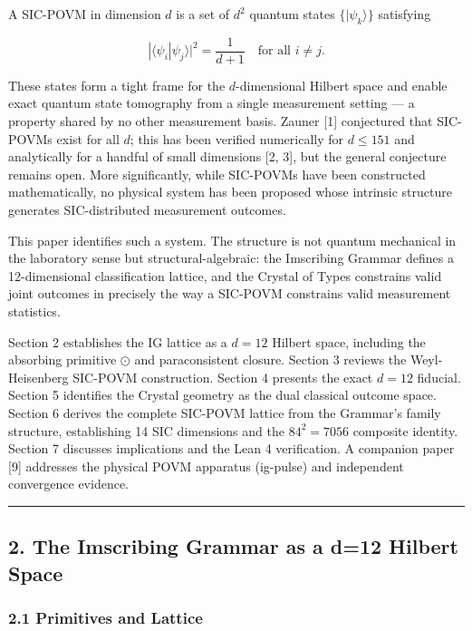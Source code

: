 \documentclass[12pt,a4paper]{article}
\begin{document}
A SIC-POVM in dimension \(d\) is a set of \(d^2\) quantum states
\(\{|\psi_k\rangle\}\) satisfying

\[|\langle \psi_i | \psi_j \rangle|^2 = \frac{1}{d+1} \quad \text{for all } i \neq j.\]

These states form a tight frame for the \(d\)-dimensional Hilbert space
and enable exact quantum state tomography from a single measurement
setting --- a property shared by no other measurement basis. Zauner
{[}1{]} conjectured that SIC-POVMs exist for all \(d\); this has been
verified numerically for \(d \leq 151\) and analytically for a handful
of small dimensions {[}2, 3{]}, but the general conjecture remains open.
More significantly, while SIC-POVMs have been constructed
mathematically, no physical system has been proposed whose intrinsic
structure generates SIC-distributed measurement outcomes.

This paper identifies such a system. The structure is not quantum
mechanical in the laboratory sense but structural-algebraic: the
Imscribing Grammar defines a 12-dimensional classification lattice, and
the Crystal of Types constrains valid joint outcomes in precisely the
way a SIC-POVM constrains valid measurement statistics.

Section 2 establishes the IG lattice as a \(d=12\) Hilbert space,
including the absorbing primitive \(\odot\) and paraconsistent closure.
Section 3 reviews the Weyl-Heisenberg SIC-POVM construction. Section 4
presents the exact \(d=12\) fiducial. Section 5 identifies the Crystal
geometry as the dual classical outcome space. Section 6 derives the
complete SIC-POVM lattice from the Grammar's family structure,
establishing 14 SIC dimensions and the \(84^2 = 7056\) composite
identity. Section 7 discusses implications and the Lean 4 verification.
A companion paper {[}9{]} addresses the physical POVM apparatus
(ig-pulse) and independent convergence evidence.

\begin{center}\rule{0.5\linewidth}{0.5pt}\end{center}

\hypertarget{the-imscribing-grammar-as-a-d12-hilbert-space}{%
\subsection{2. The Imscribing Grammar as a d=12 Hilbert
Space}\label{the-imscribing-grammar-as-a-d12-hilbert-space}}

\hypertarget{primitives-and-lattice}{%
\subsubsection{2.1 Primitives and
Lattice}\label{primitives-and-lattice}}
\end{document}
